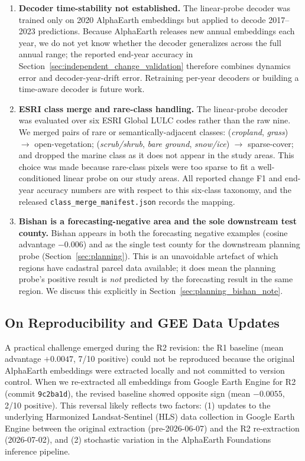 \documentclass{article}
\begin{document}
\begin{enumerate}
\item \label{lim:decoder_stability} \textbf{Decoder time-stability not established.} The linear-probe decoder was trained only on 2020 AlphaEarth embeddings but applied to decode 2017--2023 predictions. Because AlphaEarth releases new annual embeddings each year, we do not yet know whether the decoder generalizes across the full annual range; the reported end-year accuracy in Section~\ref{sec:independent_change_validation} therefore combines dynamics error and decoder-year-drift error. Retraining per-year decoders or building a time-aware decoder is future work.

\item \label{lim:esri_classes} \textbf{ESRI class merge and rare-class handling.} The linear-probe decoder was evaluated over six ESRI Global LULC codes rather than the raw nine. We merged pairs of rare or semantically-adjacent classes: (\emph{cropland}, \emph{grass}) $\to$ open-vegetation; (\emph{scrub/shrub}, \emph{bare ground}, \emph{snow/ice}) $\to$ sparse-cover; and dropped the marine class as it does not appear in the study areas. This choice was made because rare-class pixels were too sparse to fit a well-conditioned linear probe on our study areas. All reported change F1 and end-year accuracy numbers are with respect to this six-class taxonomy, and the released \texttt{class\_merge\_manifest.json} records the mapping.

\item \label{lim:bishan_role} \textbf{Bishan is a forecasting-negative area and the sole downstream test county.} Bishan appears in both the forecasting negative examples (cosine advantage $-0.006$) and as the single test county for the downstream planning probe (Section~\ref{sec:planning}). This is an unavoidable artefact of which regions have cadastral parcel data available; it does mean the planning probe's positive result is \emph{not} predicted by the forecasting result in the same region. We discuss this explicitly in Section~\ref{sec:planning_bishan_note}.
\end{enumerate}

\subsection{On Reproducibility and GEE Data Updates}
\label{sec:reproducibility_discussion}

A practical challenge emerged during the R2 revision: the R1 baseline (mean advantage $+0.0047$, 7/10 positive) could not be reproduced because the original AlphaEarth embeddings were extracted locally and not committed to version control. When we re-extracted all embeddings from Google Earth Engine for R2 (commit \texttt{9c2ba1d}), the revised baseline showed opposite sign (mean $-0.0055$, 2/10 positive). This reversal likely reflects two factors: (1) updates to the underlying Harmonized Landsat-Sentinel (HLS) data collection in Google Earth Engine between the original extraction (pre-2026-06-07) and the R2 re-extraction (2026-07-02), and (2) stochastic variation in the AlphaEarth Foundations inference pipeline.
\end{document}

